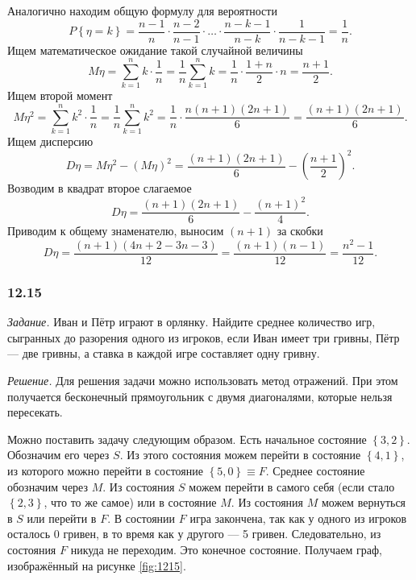 \begin{enumerate}[label=\alph*)]
Аналогично находим общую формулу для вероятности
$$P \left\{ \eta = k \right\} =
\frac{n-1}{n} \cdot \frac{n-2}{n-1} \cdot \dotsc \cdot \frac{n-k-1}{n-k} \cdot \frac{1}{n-k-1} =
\frac{1}{n}.$$
Ищем математическое ожидание такой случайной величины
$$M \eta =
\sum \limits_{k=1}^n k \cdot \frac{1}{n} =
\frac{1}{n} \sum \limits_{k=1}^n k =
\frac{1}{n} \cdot \frac{1+n}{2} \cdot n =
\frac{n+1}{2}.$$
Ищем второй момент
$$M \eta^2 =
\sum \limits_{k=1}^n k^2 \cdot \frac{1}{n} =
\frac{1}{n} \sum \limits_{k=1}^n k^2 =
\frac{1}{n} \cdot \frac{n \left( n+1 \right) \left( 2n+1 \right) }{6} =
\frac{ \left( n+1 \right) \left( 2n+1 \right) }{6}.$$
Ищем дисперсию
$$D \eta =
M \eta^2 - \left( M \eta \right)^2 =
\frac{ \left( n+1 \right) \left( 2n+1 \right) }{6} - \left( \frac{n+1}{2} \right)^2.$$
Возводим в квадрат второе слагаемое
$$D \eta =
\frac{ \left( n+1 \right) \left( 2n+1 \right) }{6} - \frac{ \left( n+1 \right)^2}{4}.$$
Приводим к общему знаменателю, выносим $ \left( n+1 \right) $ за скобки
$$D \eta =
\frac{ \left( n+1 \right) \left( 4n + 2 - 3n - 3 \right) }{12} =
\frac{ \left( n+1 \right) \left( n-1 \right) }{12} =
\frac{n^2 - 1}{12}.$$
\end{enumerate}

\subsubsection*{12.15}

\textit{Задание.} Иван и Пётр играют в орлянку.
Найдите среднее количество игр, сыгранных до разорения одного из игроков, если Иван имеет три гривны, Пётр --- две гривны, а ставка в каждой игре составляет одну гривну.

\textit{Решение.} Для решения задачи можно использовать метод отражений.
При этом получается бесконечный прямоугольник с двумя диагоналями, которые нельзя пересекать.

Можно поставить задачу следующим образом.
Есть начальное состояние $ \left\{ 3, 2 \right\} $.
Обозначим его через $S$.
Из этого состояния можем перейти в состояние $ \left\{ 4, 1 \right\} $, из которого можно перейти в состояние $ \left\{ 5, 0 \right\} \equiv F$.
Среднее состояние обозначим через $M$.
Из состояния $S$ можем перейти в самого себя (если стало $ \left\{ 2, 3 \right\} $, что то же самое) или в состояние $M$.
Из состояния $M$ можем вернуться в $S$ или перейти в $F$.
В состоянии $F$ игра закончена, так как у одного из игроков осталось 0 гривен, в то время как у другого --- 5 гривен.
Следовательно, из состояния $F$ никуда не переходим.
Это конечное состояние.
Получаем граф, изображённый на рисунке \ref{fig:1215}.

